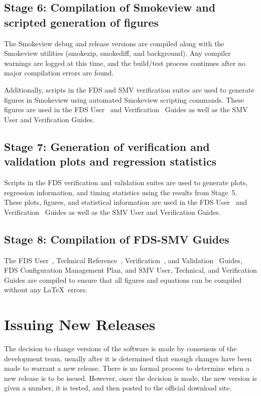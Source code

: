 \documentclass[11pt]{book}
\begin{document}
\subsection*{Stage 6: Compilation of Smokeview and scripted generation of figures}

The Smokeview debug and release versions are compiled along with the Smokeview utilities (smokezip, smokediff, and background). Any compiler warnings are logged at this time, and the build/test process continues after no major compilation errors are found.

Additionally, scripts in the FDS and SMV verification suites are used to generate figures in Smokeview using automated Smokeview scripting commands. These figures are used in the FDS User~\cite{FDS_Users_Guide} and Verification~\cite{FDS_Verification_Guide} Guides as well as the SMV User and Verification Guides.

\subsection*{Stage 7: Generation of verification and validation plots and regression statistics}

Scripts in the FDS verification and validation suites are used to generate plots, regression information, and timing statistics using the results from Stage~5. These plots, figures, and statistical information are used in the FDS User~\cite{FDS_Users_Guide} and Verification~\cite{FDS_Verification_Guide} Guides as well as the SMV User and Verification Guides.

\subsection*{Stage 8: Compilation of FDS-SMV Guides}

The FDS User~\cite{FDS_Users_Guide}, Technical Reference~\cite{FDS_Math_Guide}, Verification~\cite{FDS_Verification_Guide}, and Validation~\cite{FDS_Validation_Guide} Guides, FDS Configuration Management Plan, and SMV User, Technical, and Verification Guides are compiled to ensure that all figures and equations can be compiled without any \LaTeX\ errors.


\section{Issuing New Releases}

The decision to change versions of the software is made by consensus of the development team, usually after it is determined that enough changes have been made to warrant a new release. There is no formal process to determine when a new release is to be issued. However, once the decision is made, the new version is given a number, it is tested, and then posted to the official download site.
\end{document}
